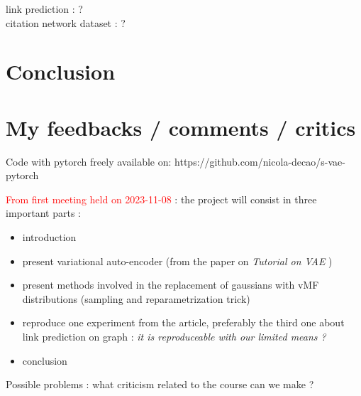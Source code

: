 \documentclass[12pt]{article}
\newcommand{\red}[1]{\textcolor{red}{#1}}
\begin{document}
link prediction : ? \\ 
citation network dataset : ?


\section{Conclusion}

\section{My feedbacks / comments / critics}

Code with pytorch freely available on: https://github.com/nicola-decao/s-vae-pytorch

\red{From first meeting held on 2023-11-08} : the project will consist in three important parts :
\begin{itemize}
    \item introduction
    \item present variational auto-encoder (from the paper on \textit{Tutorial on VAE} )
    \item present methods involved in the replacement of gaussians with vMF distributions (sampling and reparametrization trick)
    \item reproduce one experiment from the article, preferably the third one about link prediction on graph : \textit{it is reproduceable with our limited means ?} 
    \item conclusion
\end{itemize}

Possible problems : what criticism related to the course can we make ? 
\end{document}
